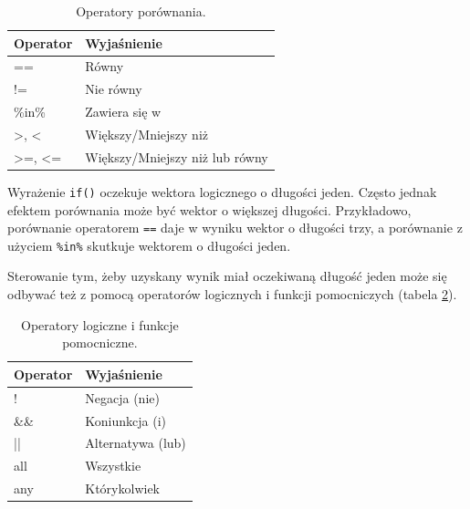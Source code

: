 \documentclass[paper=6in:9in,pagesize=pdftex,headinclude=on,footinclude=on,10pt]{scrbook}
\newenvironment{Shaded}{\begin{snugshade}}{\end{snugshade}}
\newcommand{\CommentTok}[1]{\textcolor[rgb]{0.56,0.35,0.01}{\textit{#1}}}
\newcommand{\DecValTok}[1]{\textcolor[rgb]{0.00,0.00,0.81}{#1}}
\newcommand{\KeywordTok}[1]{\textcolor[rgb]{0.13,0.29,0.53}{\textbf{#1}}}
\newcommand{\NormalTok}[1]{#1}
\newcommand{\OperatorTok}[1]{\textcolor[rgb]{0.81,0.36,0.00}{\textbf{#1}}}
\newcommand{\StringTok}[1]{\textcolor[rgb]{0.31,0.60,0.02}{#1}}
\begin{document}
\begin{table}

\caption{\label{tab:operators}Operatory porównania.}
\centering
\begin{tabular}[t]{ll}
\toprule
Operator & Wyjaśnienie\\
\midrule
== & Równy\\
!= & Nie równy\\
\%in\% & Zawiera się w\\
>, < & Większy/Mniejszy niż\\
>=, <= & Większy/Mniejszy niż lub równy\\
\bottomrule
\end{tabular}
\end{table}

Wyrażenie \texttt{if()} oczekuje wektora logicznego o długości jeden.
Często jednak efektem porównania może być wektor o większej długości.
Przykładowo, porównanie operatorem \texttt{==} daje w wyniku wektor o długości trzy, a porównanie z użyciem \texttt{\%in\%} skutkuje wektorem o długości jeden.

\begin{Shaded}
\end{Shaded}

Sterowanie tym, żeby uzyskany wynik miał oczekiwaną długość jeden może się odbywać też z pomocą operatorów logicznych i funkcji pomocniczych (tabela \ref{tab:operators2}).

\begin{table}

\caption{\label{tab:operators2}Operatory logiczne i funkcje pomocniczne.}
\centering
\begin{tabular}[t]{ll}
\toprule
Operator & Wyjaśnienie\\
\midrule
! & Negacja (nie)\\
\&\& & Koniunkcja (i)\\
|| & Alternatywa (lub)\\
all & Wszystkie\\
any & Którykolwiek\\
\bottomrule
\end{tabular}
\end{table}
\end{document}
